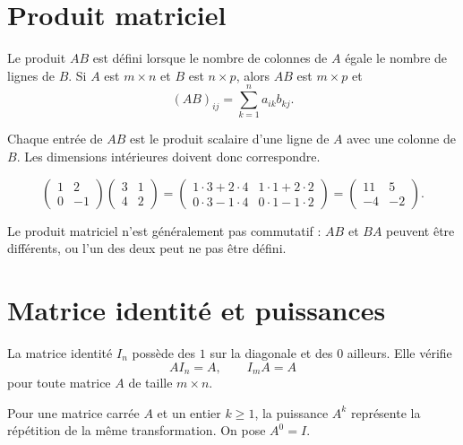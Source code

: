 \section{Produit matriciel}
\label{manual:section:11.03}

Le produit $AB$ est défini lorsque le nombre de colonnes de $A$ égale le nombre de lignes de $B$. Si $A$ est $m\times n$ et $B$ est $n\times p$, alors $AB$ est $m\times p$ et
\[
(AB)_{ij}=\sum_{k=1}^n a_{ik}b_{kj}.
\]

\begin{intuitionbox}
Chaque entrée de $AB$ est le produit scalaire d'une ligne de $A$ avec une colonne de $B$. Les dimensions intérieures doivent donc correspondre.
\end{intuitionbox}

\begin{examplebox}
\[
\begin{pmatrix}1&2\\0&-1\end{pmatrix}
\begin{pmatrix}3&1\\4&2\end{pmatrix}
=
\begin{pmatrix}
1\cdot3+2\cdot4&1\cdot1+2\cdot2\\
0\cdot3-1\cdot4&0\cdot1-1\cdot2
\end{pmatrix}
=
\begin{pmatrix}11&5\\-4&-2\end{pmatrix}.
\]
\end{examplebox}

\begin{warningbox}
Le produit matriciel n'est généralement pas commutatif : $AB$ et $BA$ peuvent être différents, ou l'un des deux peut ne pas être défini.
\end{warningbox}

\section{Matrice identité et puissances}
\label{manual:section:11.04}

La matrice identité $I_n$ possède des $1$ sur la diagonale et des $0$ ailleurs. Elle vérifie
\[
AI_n=A,
\qquad I_mA=A
\]
pour toute matrice $A$ de taille $m\times n$.

Pour une matrice carrée \(A\) et un entier \(k\ge1\), la puissance \(A^k\) représente la répétition de la même transformation. On pose \(A^0=I\).

